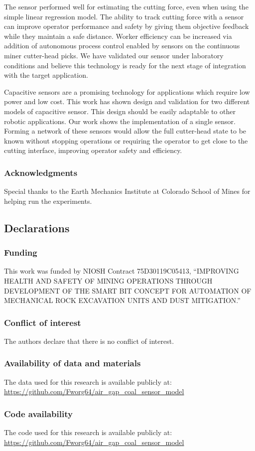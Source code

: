 The sensor performed well for estimating the cutting force, even when using the simple linear regression model.
The ability to track cutting force with a sensor can improve operator performance and safety by giving them
objective feedback while they maintain a safe distance. 
Worker efficiency can be increased via addition of 
autonomous process control enabled by sensors on the continuous miner cutter-head picks.
We have validated our sensor under laboratory conditions and believe this technology is ready
for the next stage of integration with the target application.

Capacitive sensors are a promising technology for applications which 
require low power and low cost.
This work has shown design and validation for two different models of capacitive sensor. 
This design should be easily adaptable to other robotic applications.
Our work shows the implementation of a single sensor.
Forming a network of these sensors would allow the full 
cutter-head state to be known without stopping operations
or requiring the operator to get close to the cutting interface, 
improving operator safety and efficiency.

\subsubsection{Acknowledgments}
Special thanks to the Earth Mechanics Institute at
Colorado School of Mines for helping run the experiments.

\subsection*{Declarations}

\subsubsection*{Funding}
This work was funded by NIOSH Contract
75D30119C05413, “IMPROVING HEALTH AND SAFETY OF
MINING OPERATIONS THROUGH DEVELOPMENT OF THE
SMART BIT CONCEPT FOR AUTOMATION OF MECHANICAL
ROCK EXCAVATION UNITS AND DUST MITIGATION.”

\subsubsection*{Conflict of interest}
The authors declare that there is no conflict of interest.

\subsubsection*{Availability of data and materials}
The data used for this research is available publicly at: \\
\url{https://github.com/Fworg64/air_gap_coal_sensor_model}

\subsubsection*{Code availability }
The code used for this research is available publicly at: \\
\url{https://github.com/Fworg64/air_gap_coal_sensor_model}

